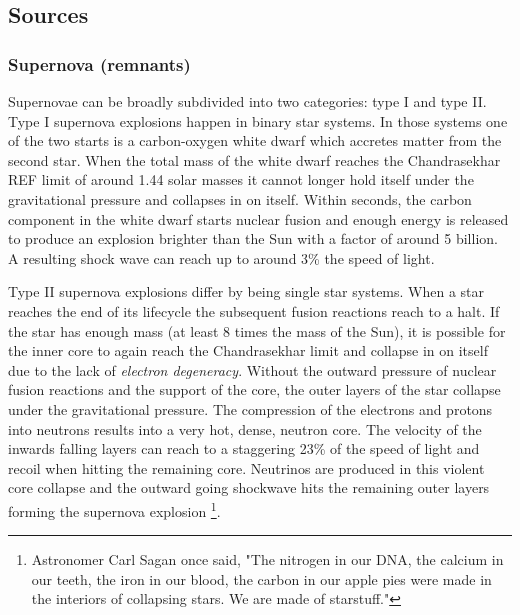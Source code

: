 \subsection{Sources}
\subsubsection{Supernova (remnants)}
Supernovae can be broadly subdivided into two categories: type I and type II. Type I supernova explosions happen in binary star systems. In those systems one of the two starts is a carbon-oxygen white dwarf which accretes matter from the second star. When the total mass of the white dwarf reaches the Chandrasekhar REF limit of around 1.44 solar masses it cannot longer hold itself under the gravitational pressure and collapses in on itself. Within seconds, the carbon component in the white dwarf starts nuclear fusion and enough energy is released to produce an explosion brighter than the Sun with a factor of around 5 billion. 
A resulting shock wave can reach up to around 3\% the speed of light.

Type II supernova explosions differ by being single star systems. When a star reaches the end of its lifecycle the subsequent fusion reactions reach to a halt. If the star has enough mass (at least 8 times the mass of the Sun), it is possible for the inner core to again reach the Chandrasekhar limit and collapse in on itself due to the lack of \textit{electron degeneracy}. Without the outward pressure of nuclear fusion reactions and the support of the core, the outer layers of the star collapse under the gravitational pressure. The compression of the electrons and protons into neutrons results into a very hot, dense, neutron core. The velocity of the inwards falling layers can reach to a staggering 23\% of the speed of light and recoil when hitting the remaining core. Neutrinos are produced in this violent core collapse and the outward going shockwave hits the remaining outer layers forming the supernova explosion \footnote{Astronomer Carl Sagan once said, "The nitrogen in our DNA, the calcium in our teeth, the iron in our blood, the carbon in our apple pies were made in the interiors of collapsing stars. We are made of starstuff."}.


